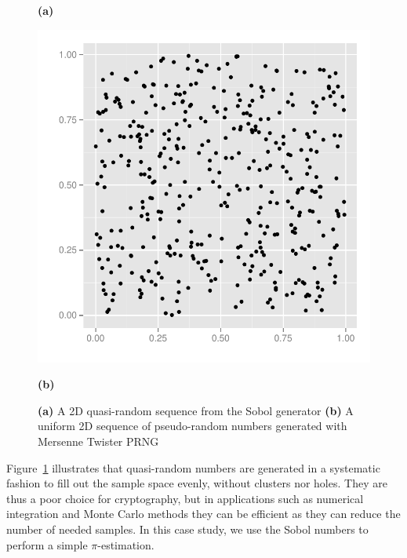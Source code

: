 \documentclass[preprint]{sigplanconf}
\begin{document}
\begin{figure}
\begin{minipage}{0.45\linewidth}
\begin{center}
      \hspace{0.55cm}\textbf{(a)}
    \end{center}
  \end{minipage}
  \begin{minipage}{0.45\linewidth}
    \begin{center}
      \includegraphics[width=\textwidth]{../report/graphics/2D-mersenne-sequence.pdf}

      \hspace{0.55cm}\textbf{(b)}
    \end{center}
  \end{minipage}

  \caption{\textbf{(a)} A 2D quasi-random sequence from the Sobol
    generator \textbf{(b)} A uniform 2D sequence of pseudo-random
    numbers generated with Mersenne Twister PRNG}
\label{fig:discrepancyplot}
\end{figure}
Figure~\ref{fig:discrepancyplot} illustrates that quasi-random numbers
are generated in a systematic fashion to fill out the sample space
evenly, without clusters nor holes. They are thus a poor choice for
cryptography, but in applications such as numerical integration and
Monte Carlo methods they can be efficient as they can reduce the
number of needed samples. In this case study, we use the Sobol numbers
to perform a simple $\pi$-estimation.
\end{document}
